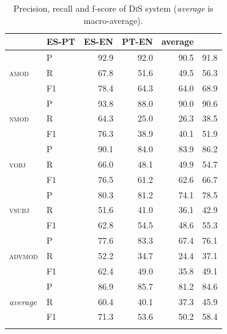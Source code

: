 \documentclass[output=paper
,modfonts
,nonflat]{langsci/langscibook}
\begin{document}
\begin{table}
  \begin{center}
    \caption{\label{tab:sys} Precision, recall and f-score of \textsc{DiS} system (\emph{average} is macro-average).}
    \begin{tabular}{llrrrr}
      \lsptoprule
      \multicolumn{2}{l}{\textbf{Pattern}} & \textbf{ES-PT} & \textbf{ES-EN} & \textbf{PT-EN} & \textbf{average}\\
      \midrule
	\multirow{3}{*}{\textsc{amod}} & P & 92.9 & 92.0 & 90.5 & 91.8\\ 
	& R & 67.8 & 51.6 & 49.5 & 56.3\\ 
	& F1 & 78.4 & 64.3 & 64.0 & 68.9\\ \midrule
	\multirow{3}{*}{\textsc{nmod}} & P & 93.8 & 88.0 & 90.0 & 90.6\\ 
	& R & 64.3 & 25.0 & 26.3 & 38.5\\ 
	& F1 & 76.3 & 38.9 & 40.1 & 51.9\\ \midrule
	\multirow{3}{*}{\textsc{vobj}} & P & 90.1 & 84.0 & 83.9 & 86.2\\ 
	& R & 66.0 & 48.1 & 49.9 & 54.7\\ 
	& F1 & 76.5 & 61.2 & 62.6 & 66.7\\ \midrule
	\multirow{3}{*}{\textsc{vsubj}} & P & 80.3 & 81.2 & 74.1 & 78.5\\ 
	& R & 51.6 & 41.0 & 36.1 & 42.9\\ 
	& F1 & 62.8 & 54.5 & 48.6 & 55.3\\ \midrule
	\multirow{3}{*}{\textsc{advmod}} & P & 77.6 & 83.3 & 67.4 & 76.1\\ 
	& R & 52.2 & 34.7 & 24.4 & 37.1\\ 
	& F1 & 62.4 & 49.0 & 35.8 & 49.1\\ \midrule
	\multirow{3}{*}{\emph{average}} & P & 86.9 & 85.7 & 81.2 & 84.6\\ 
	& R & 60.4 & 40.1 & 37.3 & 45.9\\ 
	& F1 & 71.3 & 53.6 & 50.2 & 58.4\\
      \lspbottomrule
    \end{tabular}
  \end{center}  
\end{table}
\end{document}
